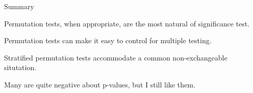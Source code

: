 \documentclass[aspectratio=169,12pt,t]{beamer}
\begin{document}
\begin{frame}{Summary}

  \bbi
\item Permutation tests, when appropriate, are the most natural
  of significance test.
\item Permutation tests can make it easy to control for multiple
  testing.
\item Stratified permutation tests accommodate a common
  non-exchangeable situtation.
\item Many are quite negative about p-values, but I still like them.
  \ei

\end{frame}
\end{document}
